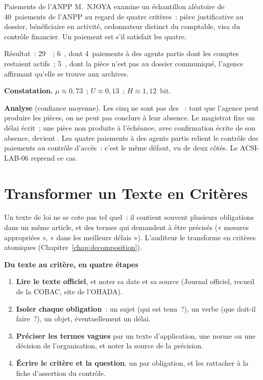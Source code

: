 \begin{boxlecture}{Paiements de l'ANPP}
M.~NJOYA examine un échantillon aléatoire de 40~paiements de l'ANPP au
regard de quatre critères~: pièce justificative au dossier, bénéficiaire
en activité, ordonnateur distinct du comptable, visa du contrôle
financier. Un paiement est \OUI{} s'il satisfait les quatre.

\medskip
Résultat~: 29~\OUI{}~; 6~\NON{}, dont 4~paiements à des agents partis
dont les comptes restaient actifs~; 5~\NEK{}, dont la pièce n'est pas au
dossier communiqué, l'agence affirmant qu'elle se trouve aux archives.

\medskip
\textbf{Constatation.} $\mu \approx 0{,}73$~; $U \approx 0{,}13$~;
$H \approx 1{,}12$~bit.

\medskip
\textbf{Analyse} (confiance moyenne). Les cinq \NEK{} ne sont pas des
\NON{}~: tant que l'agence peut produire les pièces, on ne peut pas
conclure à leur absence. Le magistrat fixe un délai écrit~; une pièce non
produite à l'échéance, avec confirmation écrite de son absence, devient
\NON{}. Les quatre paiements à des agents partis relient le contrôle des
paiements au contrôle d'accès~: c'est le même défaut, vu de deux côtés. Le
ACSI-LAB-06 reprend ce cas.

\medskip
\hfill{}
\end{boxlecture}

\section{Transformer un Texte en Critères}
\label{sec:c15-criteres}

Un texte de loi ne se cote pas tel quel~: il contient souvent plusieurs
obligations dans un même article, et des termes qui demandent à être
précisés (« mesures appropriées », « dans les meilleurs délais »).
L'auditeur le transforme en critères atomiques
(Chapitre~\ref{chap:decomposition}).

\begin{boxprocedure}
\textbf{Du texte au critère, en quatre étapes}
\begin{enumerate}
    \item \textbf{Lire le texte officiel}, et noter sa date et sa source
          (Journal officiel, recueil de la COBAC, site de l'OHADA).
    \item \textbf{Isoler chaque obligation}~: un sujet (qui est tenu~?), un
          verbe (que doit-il faire~?), un objet, éventuellement un délai.
    \item \textbf{Préciser les termes vagues} par un texte d'application,
          une norme ou une décision de l'organisation, et noter la source de
          la précision.
    \item \textbf{Écrire le critère et la question}, un par obligation, et
          les rattacher à la fiche d'assertion du contrôle.
\end{enumerate}
\end{boxprocedure}

